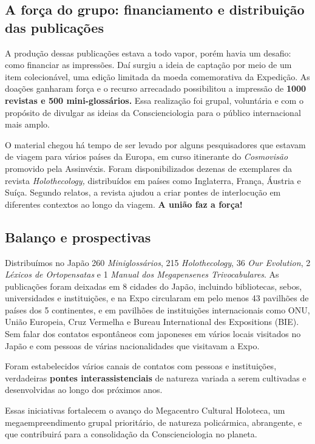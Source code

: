 \documentclass{gescons}
\begin{document}
\subsection*{A força do grupo: financiamento e distribuição das publicações}

A produção dessas publicações estava a todo vapor, porém havia um desafio: como financiar as impressões. Daí surgiu a ideia de captação por meio de um item colecionável, uma edição limitada da moeda comemorativa da Expedição. As doações ganharam força e o recurso arrecadado possibilitou a impressão de \textbf{1000 revistas e 500 mini-glossários.} Essa realização foi grupal, voluntária e com o propósito de divulgar as ideias da Conscienciologia para o público internacional mais amplo.

O material chegou há tempo de ser levado por alguns pesquisadores que estavam de viagem para vários países da Europa, em curso itinerante do \emph{Cosmovisão} promovido pela Assinvéxis. Foram disponibilizados dezenas de exemplares da revista \emph{Holothecology,} distribuídos em países como Inglaterra, França, Áustria e Suíça. Segundo relatos, a revista ajudou a criar pontes de interlocução em diferentes contextos ao longo da viagem. \textbf{A união faz a força!}

\subsection*{Balanço e prospectivas}

Distribuímos no Japão 260 \emph{Miniglossários}, 215 \emph{Holothecology}, 36 \emph{Our Evolution}, 2 \emph{Léxicos de Ortopensatas} e 1 \emph{Manual dos Megapensenes Trivocabulares}. As publicações foram deixadas em 8 cidades do Japão, incluindo bibliotecas, sebos, universidades e instituições, e na Expo circularam em pelo menos 43 pavilhões de países dos 5 continentes, e em pavilhões de instituições internacionais como ONU, União Europeia, Cruz Vermelha e Bureau International des Expositions (BIE). Sem falar dos contatos espontâneos com japoneses em vários locais visitados no Japão e com pessoas de várias nacionalidades que visitavam a Expo.

Foram estabelecidos vários canais de contatos com pessoas e instituições, verdadeiras \textbf{pontes interassistenciais} de natureza variada a serem cultivadas e desenvolvidas ao longo dos próximos anos.

Essas iniciativas fortalecem o avanço do Megacentro Cultural Holoteca, um megaempreendimento grupal prioritário, de natureza policármica, abrangente, e que contribuirá para a consolidação da Conscienciologia no planeta.


        
\end{document}
